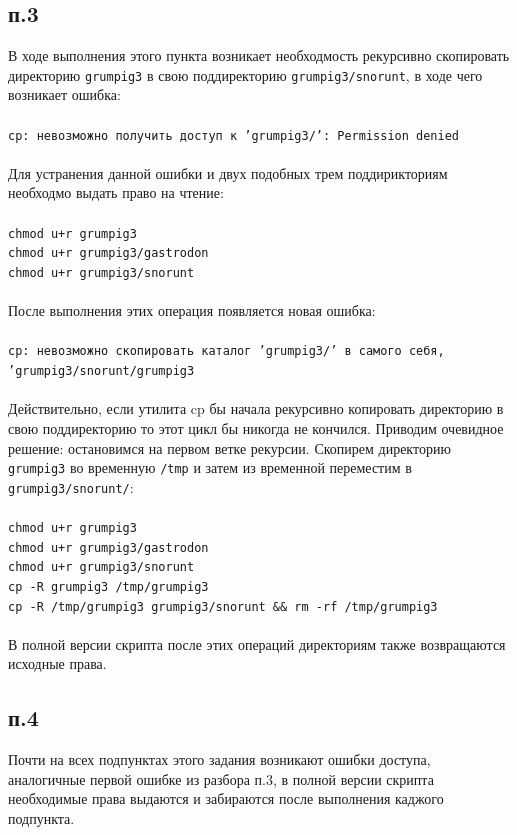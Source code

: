\documentclass[11pt]{article}
\begin{document}
\subsection*{п.3}
В ходе выполнения этого пункта возникает необходмость рекурсивно скопировать директорию \texttt{grumpig3} в свою поддиректорию \texttt{grumpig3/snorunt}, в ходе чего возникает ошибка:\\\\
	\texttt{cp: невозможно получить доступ к 'grumpig3/': Permission denied}\\\\
Для устранения данной ошибки и двух подобных трем поддирикториям необходмо выдать право на чтение:\\\\
\texttt{chmod u+r grumpig3\\
chmod u+r grumpig3/gastrodon\\
chmod u+r grumpig3/snorunt}\\
\\После выполнения этих операция появляется новая ошибка:
\\\\
\small
\texttt{cp: невозможно скопировать каталог 'grumpig3/' в самого себя, 'grumpig3/snorunt/grumpig3}
\large
\\\\
Действительно, если утилита cp бы начала рекурсивно копировать директорию в свою поддиректорию то этот цикл бы никогда не кончился. Приводим очевидное решение: остановимся на первом ветке рекурсии. Скопирем директорию \texttt{grumpig3} во временную \texttt{/tmp} и затем из временной переместим в  \texttt{grumpig3/snorunt/}:\\\\
\texttt{chmod u+r grumpig3\\
chmod u+r grumpig3/gastrodon\\
chmod u+r grumpig3/snorunt\\
cp -R grumpig3 /tmp/grumpig3\\
cp -R /tmp/grumpig3 grumpig3/snorunt \&\& rm -rf /tmp/grumpig3}\\\\
В полной версии скрипта после этих операций директориям также возвращаются исходные права.
\subsection*{п.4}
Почти на всех подпунктах этого задания возникают ошибки доступа, аналогичные первой ошибке из разбора п.3, в полной версии скрипта необходимые
 права выдаются и забираются после выполнения каджого подпункта.
\end{document}
